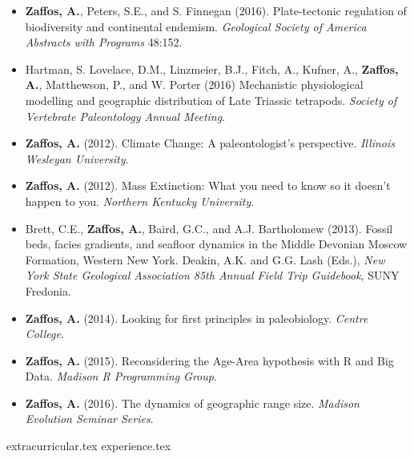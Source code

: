 \documentclass[12pt, a4paper]{awesome-cv}
\newcommand*{\sectiondir}{resume/}
\begin{document}
\begin{itemize}[leftmargin=*]
\item{\textbf{Zaffos, A.}, Peters, S.E., and S. Finnegan (2016). Plate-tectonic regulation of biodiversity and continental endemism. \textit{Geological Society of America Abstracts with Programs} 48:152.}
\item{Hartman, S. Lovelace, D.M., Linzmeier, B.J., Fitch, A., Kufner, A., \textbf{Zaffos, A.}, Matthewson, P., and W. Porter (2016) Mechanistic physiological modelling and geographic distribution of Late Triassic tetrapods. \textit{Society of Vertebrate Paleontology Annual Meeting}.}
\end{itemize}

\fontsize{10pt}{1em}\bodyfontlight\upshape\color{text}
\begin{itemize}[leftmargin=*]
\item{\textbf{Zaffos, A.} (2012). Climate Change: A paleontologist's perspective. \textit{Illinois Wesleyan University}.}
\item{\textbf{Zaffos, A.} (2012). Mass Extinction: What you need to know so it doesn't happen to you. \textit{Northern Kentucky University}.}
\item{Brett, C.E., \textbf{Zaffos, A.}, Baird, G.C., and A.J. Bartholomew (2013). Fossil beds, facies gradients, and seafloor dynamics in the Middle Devonian Moscow Formation, Western New York. Deakin, A.K. and G.G. Lash (Eds.), \textit{New York State Geological Association 85th Annual Field Trip Guidebook}, SUNY Fredonia.}
\item{\textbf{Zaffos, A.} (2014). Looking for first principles in paleobiology. \textit{Centre College}.}
\item{\textbf{Zaffos, A.} (2015). Reconsidering the Age-Area hypothesis with R and Big Data. \textit{Madison R Programming Group}.}
\item{\textbf{Zaffos, A.} (2016). The dynamics of geographic range size. \textit{Madison Evolution Seminar Series}.}
\end{itemize}

{extracurricular.tex}
\vspace{-20pt}
{experience.tex}
\vspace{-20pt}
\end{document}
